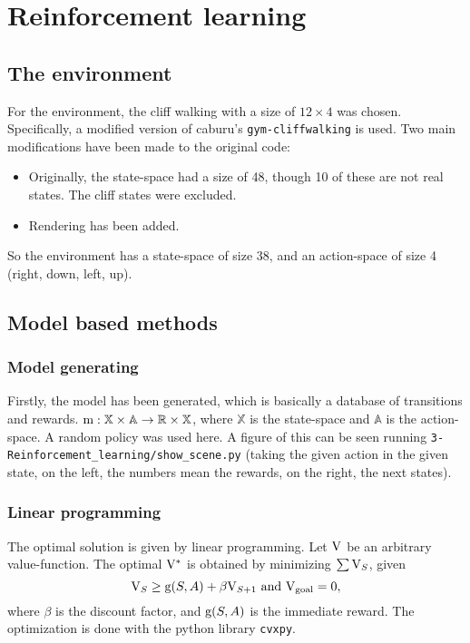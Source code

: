 \section{Reinforcement learning}

\subsection{The environment}

For the environment, the cliff walking with a size of $12\times4$ was chosen.
Specifically, a modified version of caburu's \verb|gym-cliffwalking|\cite{cliffwalking} is used.
Two main modifications have been made to the original code:
\begin{itemize}
	\item Originally, the state-space had a size of 48, though 10 of these are not real states.
		The cliff states were excluded.
	\item Rendering has been added.
\end{itemize}
So the environment has a state-space of size 38,
and an action-space of size 4 (right, down, left, up).


\subsection{Model based methods}

\subsubsection{Model generating}

Firstly, the model has been generated, which is basically a database of transitions and
rewards. $\mathrm{m}: \mathbb{X}\times\mathbb{A}\rightarrow\mathbb{R}\times\mathbb{X}$,
where $\mathbb{X}$ is the state-space and $\mathbb{A}$ is the action-space. A random
policy was used here. A figure of this can be seen running
\verb|3-Reinforcement_learning/show_scene.py| (taking the given action in the given state,
on the left, the numbers mean the rewards, on the right, the next states).

\subsubsection{Linear programming}

The optimal solution is given by linear programming.
Let $\mathrm{V}$ be an arbitrary value-function.
The optimal $\mathrm{V}^*$ is obtained by minimizing $\sum\mathrm{V}_S$, given
\begin{equation}
	\mathrm{V}_S\geq\mathrm{g}
(S, A) + \beta\mathrm{V}_{S+1} \text{ and } \mathrm{V}_\text{goal}=0,
\end{equation}
where $\beta$ is the discount factor, and $\mathrm{g}(S, A)$ is the immediate reward.
The optimization is done with the python library \verb|cvxpy|.

